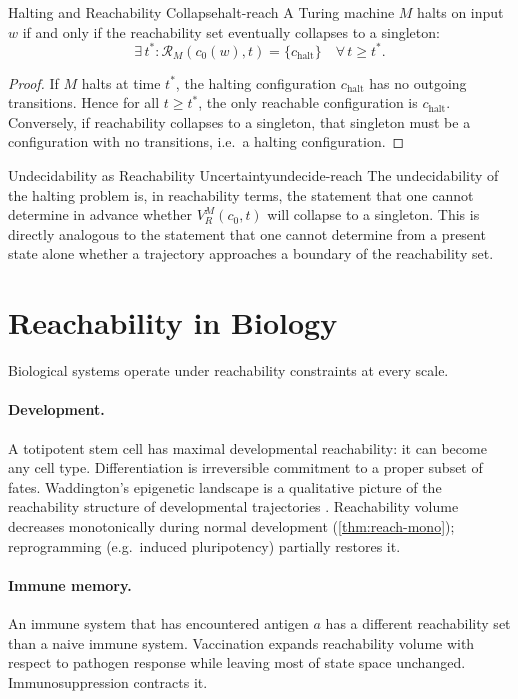 \documentclass[12pt,twoside,openright]{book}
\newcommand{\bioicon}{\marginpar{\tiny\color{DistTeal}\faDna}}
\newcommand{\reach}{\mathcal{R}}
\begin{document}
\begin{proposition}{Halting and Reachability Collapse}{halt-reach}
  A Turing machine $M$ halts on input $w$ if and only if
  the reachability set eventually collapses to a singleton:
  \[
    \exists\, t^* :
    \reach_M(c_0(w),t) = \{c_\mathrm{halt}\}
    \quad \forall\, t \ge t^*.
  \]
\end{proposition}

\begin{proof}
  If $M$ halts at time $t^*$, the halting configuration
  $c_\mathrm{halt}$ has no outgoing transitions. Hence for
  all $t\ge t^*$, the only reachable configuration is
  $c_\mathrm{halt}$. Conversely, if reachability collapses
  to a singleton, that singleton must be a configuration
  with no transitions, i.e.\ a halting configuration.
\end{proof}

\begin{remark}{Undecidability as Reachability Uncertainty}{undecide-reach}
  The undecidability of the halting problem is, in
  reachability terms, the statement that one cannot
  determine in advance whether $V_R^M(c_0,t)$ will collapse
  to a singleton. This is directly analogous to the
  statement that one cannot determine from a present state
  alone whether a trajectory approaches a boundary of the
  reachability set.
\end{remark}

\section{Reachability in Biology}
\label{sec:ch13-biology}

\bioicon
Biological systems operate under reachability constraints
at every scale.

\paragraph{Development.} A totipotent stem cell has maximal
developmental reachability: it can become any cell type.
Differentiation is irreversible commitment to a proper
subset of fates. Waddington's epigenetic landscape is a
qualitative picture of the reachability structure of
developmental trajectories \parencite{waddington1957strategy}.
Reachability volume decreases monotonically during normal
development (\cref{thm:reach-mono}); reprogramming
(e.g.\ induced pluripotency) partially restores it.

\paragraph{Immune memory.} An immune system that has
encountered antigen $a$ has a different reachability set
than a naive immune system. Vaccination expands
reachability volume with respect to pathogen response while
leaving most of state space unchanged. Immunosuppression
contracts it.
\end{document}
